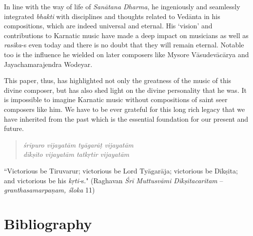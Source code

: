 In line with the way of life of \textit{Sanātana Dharma}, he ingeniously and seamlessly integrated \textit{bhakti} with disciplines and thoughts related to Vedānta in his compositions, which are indeed universal and eternal. His ‘vision’ and contributions to Karnatic music have made a deep impact on musicians as well as \textit{rasika}-s even today and there is no doubt that they will remain eternal. Notable too is the influence he wielded on later composers like Mysore Vāsudevācārya and Jayachamarajendra Wodeyar.

This paper, thus, has highlighted not only the greatness of the music of this divine composer, but has also shed light on the divine personality that he was. It is impossible to imagine Karnatic music without compositions of saint seer composers like him. We have to be ever grateful for this long rich legacy that we have inherited from the past which is the essential foundation for our present and future.

\vspace{-.3cm}

\begin{verse}
\textit{śrīpuro vijayatām tyāgarāṭ vijayatām} \\ \textit{dīkṣito vijayatām tatkṛtir vijayatām} 
\end{verse}

\vspace{-.3cm}

``Victorious be Tiruvarur; victorious be Lord Tyāgarāja; victorious be Dīkṣita; and victorious be his \textit{kṛti-}s." (Raghavan \textit{Śrī Muttusvāmi Dīkṣitacaritam} – \textit{granthasamarpaṇam, śloka} 11)


\vspace{-.3cm}

\section*{Bibliography}

\vspace{-.2cm}

